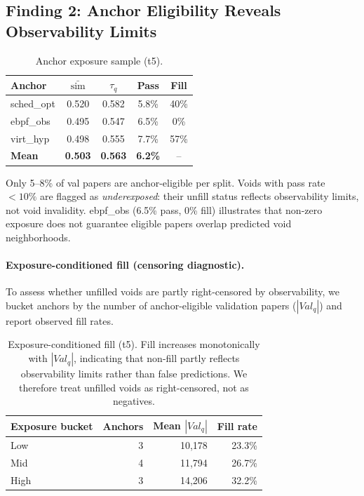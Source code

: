 \documentclass[11pt,twocolumn]{article}
\newcommand{\tauanchor}{\tau_{q}}
\begin{document}
\subsection{Finding 2: Anchor Eligibility Reveals Observability Limits}

\begin{table}[h!]
\centering\small
\caption{Anchor exposure sample (t5).}
\begin{tabular}{lcccc}
\toprule
Anchor & $\bar{\mathrm{sim}}$ & $\tauanchor$ & Pass & Fill \\
\midrule
sched\_opt & 0.520 & 0.582 & 5.8\% & 40\% \\
ebpf\_obs  & 0.495 & 0.547 & 6.5\% & 0\%  \\
virt\_hyp  & 0.498 & 0.555 & 7.7\% & 57\% \\
\textbf{Mean} & \textbf{0.503} & \textbf{0.563} & \textbf{6.2\%} & -- \\
\bottomrule
\end{tabular}
\end{table}

Only 5--8\% of val papers are anchor-eligible per split. Voids with pass rate $<10\%$
are flagged as \emph{underexposed}: their unfill status reflects observability limits,
not void invalidity. ebpf\_obs (6.5\% pass, 0\% fill) illustrates that non-zero
exposure does not guarantee eligible papers overlap predicted void neighborhoods.

\paragraph{Exposure-conditioned fill (censoring diagnostic).}
To assess whether unfilled voids are partly right-censored by observability, we
bucket anchors by the number of anchor-eligible validation papers ($|Val_q|$) and
report observed fill rates.

\begin{table}[h!]
\centering\small
\caption{Exposure-conditioned fill (t5). Fill increases monotonically with $|Val_q|$,
indicating that non-fill partly reflects observability limits rather than false
predictions. We therefore treat unfilled voids as right-censored, not as negatives.}
\begin{tabular}{lrrr}
\toprule
Exposure bucket & Anchors & Mean $|Val_q|$ & Fill rate \\
\midrule
Low  & 3 & 10{,}178 & 23.3\% \\
Mid  & 4 & 11{,}794 & 26.7\% \\
High & 3 & 14{,}206 & 32.2\% \\
\bottomrule
\end{tabular}
\end{table}
\end{document}
